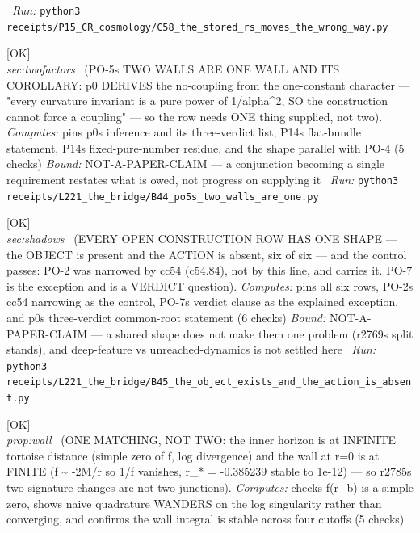 \begin{description}
\ \emph{Run:} \texttt{python3 receipts/P15\_CR\_cosmology/C58\_the\_stored\_rs\_moves\_the\_wrong\_way.py}
\item[\label{rcpt:B44_po5s_two_walls_are_one}\texttt{B44\_po5s\_two\_walls\_are\_one}]\hfill\textsf{[OK]}\\
\textit{sec:twofactors} \ (PO-5s TWO WALLS ARE ONE WALL AND ITS COROLLARY: p0 DERIVES the no-coupling from the one-constant character --- "every curvature invariant is a pure power of 1/alpha\textasciicircum{}2, SO the construction cannot force a coupling" --- so the row needs ONE thing supplied, not two). 
\emph{Computes:} pins p0s inference and its three-verdict list, P14s flat-bundle statement, P14s fixed-pure-number residue, and the shape parallel with PO-4 (5 checks)
 \emph{Bound:} NOT-A-PAPER-CLAIM --- a conjunction becoming a single requirement restates what is owed, not progress on supplying it
\ \emph{Run:} \texttt{python3 receipts/L221\_the\_bridge/B44\_po5s\_two\_walls\_are\_one.py}
\item[\label{rcpt:B45_the_object_exists_and_the_action_is_absent}\texttt{B45\_the\_object\_exists\_and\_the\_action\_is\_absent}]\hfill\textsf{[OK]}\\
\textit{sec:shadows} \ (EVERY OPEN CONSTRUCTION ROW HAS ONE SHAPE --- the OBJECT is present and the ACTION is absent, six of six --- and the control passes: PO-2 was narrowed by cc54 (c54.84), not by this line, and carries it. PO-7 is the exception and is a VERDICT question). 
\emph{Computes:} pins all six rows, PO-2s cc54 narrowing as the control, PO-7s verdict clause as the explained exception, and p0s three-verdict common-root statement (6 checks)
 \emph{Bound:} NOT-A-PAPER-CLAIM --- a shared shape does not make them one problem (r2769s split stands), and deep-feature vs unreached-dynamics is not settled here
\ \emph{Run:} \texttt{python3 receipts/L221\_the\_bridge/B45\_the\_object\_exists\_and\_the\_action\_is\_absent.py}
\item[\label{rcpt:B46_one_matching_not_two}\texttt{B46\_one\_matching\_not\_two}]\hfill\textsf{[OK]}\\
\textit{prop:wall} \ (ONE MATCHING, NOT TWO: the inner horizon is at INFINITE tortoise distance (simple zero of f, log divergence) and the wall at r=0 is at FINITE (f \textasciitilde{} -2M/r so 1/f vanishes, r\_* = -0.385239 stable to 1e-12) --- so r2785s two signature changes are not two junctions). 
\emph{Computes:} checks f(r\_b) is a simple zero, shows naive quadrature WANDERS on the log singularity rather than converging, and confirms the wall integral is stable across four cutoffs (5 checks)

\end{description}

